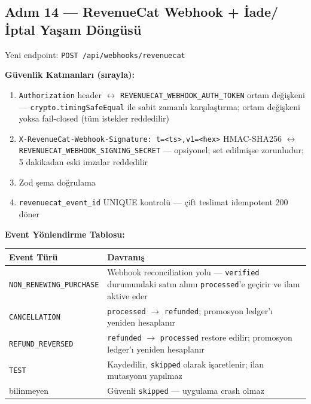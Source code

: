 \documentclass[12pt,a4paper]{article}
\begin{document}
\subsection{Adım 14 — RevenueCat Webhook + İade/İptal Yaşam Döngüsü}

Yeni endpoint: \texttt{POST /api/webhooks/revenuecat}

\vspace{0.5em}
\noindent\textbf{Güvenlik Katmanları (sırayla):}

\begin{enumerate}[leftmargin=1.5em]
  \item \texttt{Authorization} header $\leftrightarrow$ \texttt{REVENUECAT\_WEBHOOK\_AUTH\_TOKEN}
        ortam değişkeni — \texttt{crypto.timingSafeEqual} ile sabit zamanlı karşılaştırma;
        ortam değişkeni yoksa fail-closed (tüm istekler reddedilir)
  \item \texttt{X-RevenueCat-Webhook-Signature: t=\textless ts\textgreater,v1=\textless hex\textgreater}
        HMAC-SHA256 $\leftrightarrow$ \texttt{REVENUECAT\_WEBHOOK\_SIGNING\_SECRET}
        — opsiyonel; set edilmişse zorunludur; 5 dakikadan eski imzalar reddedilir
  \item Zod şema doğrulama
  \item \texttt{revenuecat\_event\_id} UNIQUE kontrolü — çift teslimat idempotent 200 döner
\end{enumerate}

\vspace{0.5em}
\noindent\textbf{Event Yönlendirme Tablosu:}

\begin{tabularx}{\textwidth}{lX}
  \toprule
  \textbf{Event Türü} & \textbf{Davranış} \\
  \midrule
  \texttt{NON\_RENEWING\_PURCHASE} &
    Webhook reconciliation yolu — \texttt{verified} durumundaki satın alımı
    \texttt{processed}'e geçirir ve ilanı aktive eder \\
  \texttt{CANCELLATION} &
    \texttt{processed} $\rightarrow$ \texttt{refunded}; promosyon ledger'ı
    yeniden hesaplanır \\
  \texttt{REFUND\_REVERSED} &
    \texttt{refunded} $\rightarrow$ \texttt{processed} restore edilir;
    promosyon ledger'ı yeniden hesaplanır \\
  \texttt{TEST} &
    Kaydedilir, \texttt{skipped} olarak işaretlenir; ilan mutasyonu yapılmaz \\
  bilinmeyen & Güvenli \texttt{skipped} — uygulama crash olmaz \\
  \bottomrule
\end{tabularx}
\end{document}
